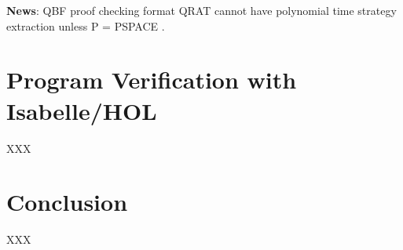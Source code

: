 \documentclass[runningheads]{llncs}
\newcommand{\0}{0}
\newcommand{\1}{1}
\begin{document}
\noindent\textbf{News}:  QBF proof checking format QRAT cannot have polynomial time strategy extraction unless P = PSPACE \cite{ChewC20}.
\section{Program Verification with Isabelle/HOL} \label{sec:Isabelle}

XXX

\section{Conclusion} \label{sec:conclusion}

XXX



%

\end{document}
